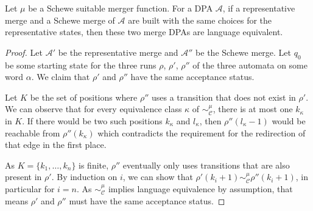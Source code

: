 \begin{theorem}
	Let $\mu$ be a Schewe suitable merger function. For a DPA $\mathcal{A}$, if a representative merge and a Schewe merge of $\mathcal{A}$ are built with the same choices for the representative states, then these two merge DPAs are language equivalent.
\end{theorem}

\begin{proof}
	Let $\mathcal{A}'$ be the representative merge and $\mathcal{A}''$ be the Schewe merge. Let $q_0$ be some starting state for the three runs $\rho$, $\rho'$, $\rho''$ of the three automata on some word $\alpha$. We claim that $\rho'$ and $\rho''$ have the same acceptance status.
	
	Let $K$ be the set of positions where $\rho''$ uses a transition that does not exist in $\rho'$. We can observe that for every equivalence class $\kappa$ of $\sim_\mathcal{C}^\mu$, there is at most one $k_\kappa$ in $K$. If there would be two such positions $k_\kappa$ and $l_\kappa$, then $\rho''(l_\kappa - 1)$ would be reachable from $\rho''(k_\kappa)$ which contradicts the requirement for the redirection of that edge in the first place.
	
	As $K = \{k_1, \dots, k_n\}$ is finite, $\rho''$ eventually only uses transitions that are also present in $\rho'$. By induction on $i$, we can show that $\rho'(k_i + 1) \sim_\mathcal{C}^\mu \rho''(k_i + 1)$, in particular for $i = n$. As $\sim_\mathcal{C}^\mu$ implies language equivalence by assumption, that means $\rho'$ and $\rho''$ must have the same acceptance status.
\end{proof}